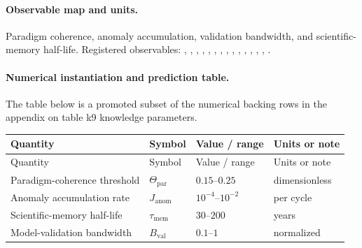 \paragraph{Observable map and units.}
Paradigm coherence, anomaly accumulation, validation bandwidth, and scientific-memory half-life.
Registered observables: , \allowbreak {}, \allowbreak {}, \allowbreak {}, \allowbreak {}, \allowbreak {}, \allowbreak {}, \allowbreak {}, \allowbreak {}, \allowbreak {}, \allowbreak {}, \allowbreak {}, \allowbreak {}, \allowbreak {}, \allowbreak {}.

\paragraph{Numerical instantiation and prediction table.}
The table below is a promoted subset of the numerical backing rows in the appendix on table k9 knowledge parameters.
\begin{longtable}{@{}L{0.27\textwidth}L{0.15\textwidth}L{0.24\textwidth}L{0.16\textwidth}@{}}
\toprule
Quantity & Symbol & Value / range & Units or note \\
\midrule
\endfirsthead
\toprule
Quantity & Symbol & Value / range & Units or note \\
\midrule
\endhead
Paradigm-coherence threshold & $\scriptstyle \Theta_{\mathrm{par}}$ & $0.15\text{--}0.25$ & dimensionless \\
Anomaly accumulation rate & $\scriptstyle J_{\mathrm{anom}}$ & $10^{-4}\text{--}10^{-2}$ & per cycle \\
Scientific-memory half-life & $\scriptstyle \tau_{\mathrm{mem}}$ & $30\text{--}200$ & years \\
Model-validation bandwidth & $\scriptstyle B_{\mathrm{val}}$ & $0.1\text{--}1$ & normalized \\
\bottomrule
\end{longtable}

